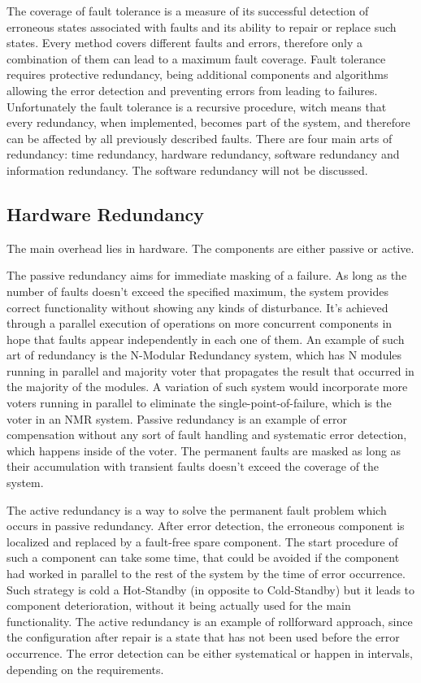The coverage of fault tolerance is a measure of its successful detection of erroneous states associated with faults and its ability to repair or replace such states. Every method covers different faults and errors, therefore only a combination of them can lead to a maximum fault coverage.
Fault tolerance requires protective redundancy, being additional components and algorithms allowing the error detection and preventing errors from leading to failures. Unfortunately the fault tolerance is a recursive procedure, witch means that every redundancy, when implemented, becomes part of the system, and therefore can be affected by all previously described faults.
There are four main arts of redundancy: time redundancy, hardware redundancy, software redundancy and information redundancy. The software redundancy will not be discussed.
\subsection{Hardware Redundancy} \label{ssec:HWred}
The main overhead lies in hardware. The components are either passive or active. 

The passive redundancy aims for immediate masking of a failure. As long as the number of faults doesn't exceed the specified maximum, the system provides correct functionality without showing any kinds of disturbance. It's achieved through a parallel execution of operations on more concurrent components in hope that faults appear independently in each one of them. An example of such art of redundancy is the N-Modular Redundancy system, which has N modules running in parallel and majority voter that propagates the result that occurred in the majority of the modules. A variation of such system would incorporate more voters running in parallel to eliminate the single-point-of-failure, which is the voter in an NMR system. Passive redundancy is an example of error compensation without any sort of fault handling and systematic error detection, which happens inside of the voter. The permanent faults are masked as long as their accumulation with transient faults doesn't exceed the coverage of the system.

The active redundancy is a way to solve the permanent fault problem which occurs in passive redundancy. After error detection, the erroneous component is localized and replaced by a fault-free spare component. The start procedure of such a component can take some time, that could be avoided if the component had worked in parallel to the rest of the system by the time of error occurrence. Such strategy is cold a Hot-Standby (in opposite to Cold-Standby) but it leads to component deterioration, without it being actually used for the main functionality. The active redundancy is an example of rollforward approach, since the configuration after repair is a state that has not been used before the error occurrence. The error detection can be either systematical or happen in intervals, depending on the requirements.

